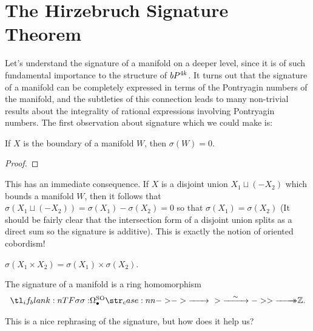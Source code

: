 \section{The Hirzebruch Signature Theorem}

Let's understand the signature of a manifold on a deeper level, since it is of such fundamental importance to the structure of $bP^{4k}$.  It turns out that the signature of a manifold can be completely expressed in terms of the Pontryagin numbers of the manifold, and the subtleties of this connection leads to many non-trivial results about the integrality of rational expressions involving Pontryagin numbers. The first observation about signature which we could make is:

\begin{proposition}
	If $X$ is the boundary of a manifold $W$, then $\sigma(W)=0$.
\end{proposition}
\begin{proof}
\end{proof}

This has an immediate consequence. If $X$ is a disjoint union $X_1\sqcup (-X_2)$ which bounds a manifold $W$, then it follows that $\sigma(X_1\sqcup (-X_2))=\sigma(X_1)-\sigma(X_2)=0$ so that $\sigma(X_1)=\sigma(X_2)$ (It should be fairly clear that the intersection form of a disjoint union splits as a direct sum so the signature is additive). 
This is exactly the notion of oriented cobordism!

\begin{proposition}
	$\sigma(X_1\times X_2) = \sigma(X_1)\times \sigma(X_2)$.
\end{proposition}

\begin{corollary}
	The signature of a manifold is a ring homomorphism
	\[
		\lkxfunc{\sigma}{\Omega^\SO_{\bullet}}{\Z.}
	\]
\end{corollary}

This is a nice rephrasing of the signature, but how does it help us?


